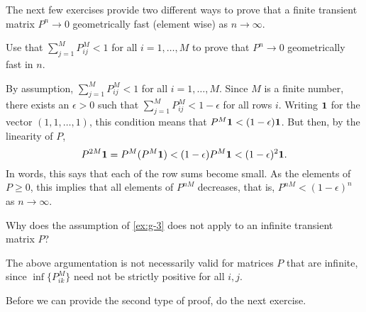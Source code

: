 The next few exercises provide two different ways to prove that a finite transient matrix $P^n\to 0$ geometrically fast (element wise) as $n\to\infty$. 

\begin{exercise}
Use that $\sum_{j=1}^M P^M_{i j} <1$ for all $i=1,\ldots, M$ to prove that $P^n \to 0$ geometrically fast in $n$. 
\begin{solution}
By assumption, $\sum_{j=1}^M P^M_{i j} <1$ for all $i=1,\ldots,M$. Since $M$ is a finite number, there exists an $\epsilon>0$ such that $\sum_{j=1}^M P^M_{i j} < 1-\epsilon$ for all rows $i$. 
Writing $\bf{1}$ for the vector $(1,1,\ldots, 1)$, this condition means that $P^M{\bf 1} < (1-\epsilon) {\bf 1}$. But then, by the linearity of $P$,
\begin{equation*}
  P^{2M} {\bf 1} = P^M(P^M{\bf 1}) < (1-\epsilon) P^M {\bf 1} < (1-\epsilon)^2 {\bf 1}. 
\end{equation*}
In words, this says that each of the row sums become small. As the elements of $P\geq 0$, this implies that all elements of $P^{nM}$ decreases, that is, $P^{nM} < (1-\epsilon)^n$ as $n\to \infty$. 
\end{solution}
\end{exercise}


\begin{extra}
  Why does the assumption of \cref{ex:g-3} does not apply to an infinite transient matrix $P$?
\begin{solution}
  The above argumentation is not necessarily valid for matrices $P$ that are infinite, since $\inf\{P^{M}_{ik}\}$ need not be strictly positive for all $i, j$. 
\end{solution}
\end{extra}

Before we can provide the second type of proof, do the next exercise.

